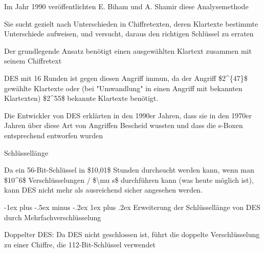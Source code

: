 \documentclass[a4paper]{article}
\makeatletter
\renewcommand{\subsubsection}{\@startsection{subsubsection}{3}{0mm}%
 {-1ex plus -.5ex minus -.2ex}%
 {1ex plus .2ex}%
 {\normalfont\small\bfseries}}
\makeatother
\begin{document}
\begin{multicols}{3}
\begin{itemize*}
            \begin{itemize*}
                  \item Im Jahr 1990 veröffentlichten E. Biham und A. Shamir diese Analysemethode
                  \item Sie sucht gezielt nach Unterschieden in Chiffretexten, deren Klartexte bestimmte Unterschiede aufweisen, und versucht, daraus den richtigen Schlüssel zu erraten
                  \item Der grundlegende Ansatz benötigt einen ausgewählten Klartext zusammen mit seinem Chiffretext
                  \item DES mit 16 Runden ist gegen diesen Angriff immun, da der Angriff \$2\^{}\{47\}\$ gewählte Klartexte oder (bei "Umwandlung" in einen Angriff mit bekannten Klartexten) \$2\^{}55\$ bekannte Klartexte benötigt.
                  \item Die Entwickler von DES erklärten in den 1990er Jahren, dass sie in den 1970er Jahren über diese Art von Angriffen Bescheid wussten und dass die s-Boxen entsprechend entworfen wurden
            \end{itemize*}
            \item
            Schlüssellänge

            \begin{itemize*}
                  \item Da ein 56-Bit-Schlüssel in \$10,01\$ Stunden durchsucht werden kann, wenn man \$10\^{}6\$ Verschlüsselungen / \$\textbackslash mu s\$ durchführen kann (was heute möglich ist), kann DES nicht mehr als ausreichend sicher angesehen werden.
            \end{itemize*}
      \end{itemize*}


      \subsubsection{Erweiterung der Schlüssellänge von DES durch
            Mehrfachverschlüsselung}

      \begin{itemize*}
            \item
            Doppelter DES: Da DES nicht geschlossen ist, führt die doppelte
            Verschlüsselung zu einer Chiffre, die 112-Bit-Schlüssel verwendet


\end{itemize*}
\end{multicols}
\end{document}
